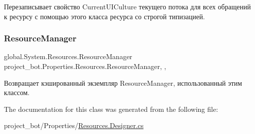Перезаписывает свойство Current\+U\+I\+Culture текущего потока для всех обращений к ресурсу с помощью этого класса ресурса со строгой типизацией. 

\mbox{\label{classproject__bot_1_1_properties_1_1_resources_a3f054d54e95800568ebf58498aa2fe67}} 
\subsubsection{\texorpdfstring{Resource\+Manager}{ResourceManager}}
{\footnotesize\ttfamily global.\+System.\+Resources.\+Resource\+Manager project\+\_\+bot.\+Properties.\+Resources.\+Resource\+Manager\hspace{0.3cm}{\ttfamily [static]}, {\ttfamily [get]}, {\ttfamily [package]}}



Возвращает кэшированный экземпляр Resource\+Manager, использованный этим классом. 



The documentation for this class was generated from the following file\+:\begin{DoxyCompactItemize}
\item 
project\+\_\+bot/\+Properties/\hyperlink{_resources_8_designer_8cs}{Resources.\+Designer.\+cs}\end{DoxyCompactItemize}
